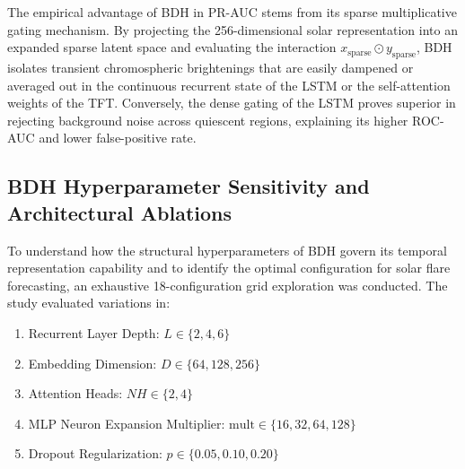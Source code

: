 \documentclass[oneside]{ieeeaccess}
\begin{document}
\begin{table}[!t]
\caption{Performance Comparison of Temporal Models on the Independent Test Set (Prevalence = 1.52\%)}
\label{tab:model_comparison}
\centering
{}
\end{table}

The empirical advantage of BDH in PR-AUC stems from its sparse multiplicative gating mechanism. By projecting the 256-dimensional solar representation into an expanded sparse latent space and evaluating the interaction $x_{\mathrm{sparse}} \odot y_{\mathrm{sparse}}$, BDH isolates transient chromospheric brightenings that are easily dampened or averaged out in the continuous recurrent state of the LSTM or the self-attention weights of the TFT. Conversely, the dense gating of the LSTM proves superior in rejecting background noise across quiescent regions, explaining its higher ROC-AUC and lower false-positive rate.

\subsection{BDH Hyperparameter Sensitivity and Architectural Ablations}

To understand how the structural hyperparameters of BDH govern its temporal representation capability and to identify the optimal configuration for solar flare forecasting, an exhaustive 18-configuration grid exploration was conducted. The study evaluated variations in:
\begin{enumerate}
    \item Recurrent Layer Depth: $L \in \{2, 4, 6\}$
    \item Embedding Dimension: $D \in \{64, 128, 256\}$
    \item Attention Heads: $NH \in \{2, 4\}$
    \item MLP Neuron Expansion Multiplier: $\mathrm{mult} \in \{16, 32, 64, 128\}$
    \item Dropout Regularization: $p \in \{0.05, 0.10, 0.20\}$
\end{enumerate}
\end{document}
